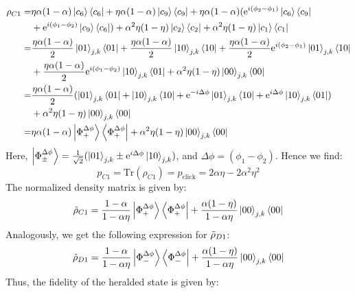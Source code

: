 \begin{subequations}
    \begin{align}
        \rho_{C1} =&  \eta\alpha(1-\alpha)\ket{c_6}\bra{c_6} + \eta\alpha(1-\alpha)\ket{c_9}\bra{c_9} + \eta\alpha(1-\alpha)(\text{e}^{i(\phi_{2}-\phi_{1})}\ket{c_6}\bra{c_9} \nonumber\\
        &+ \text{e}^{i(\phi_{1}-\phi_{2})}\ket{c_9}\bra{c_6}) + \alpha^2\eta(1-\eta)\ket{c_2}\bra{c_2} + \alpha^2\eta(1-\eta)\ket{c_1}\bra{c_1}\\
        =& \frac{\eta\alpha(1-\alpha)}{2}\ket{01}_{j,k}\bra{01} + \frac{\eta\alpha(1-\alpha)}{2}\ket{10}_{j,k}\bra{10} + \frac{\eta\alpha(1-\alpha)}{2}\text{e}^{i(\phi_{2}-\phi_{1})}\ket{01}_{j,k}\bra{10}\nonumber\\
        &+ \frac{\eta\alpha(1-\alpha)}{2}\text{e}^{i(\phi_{1}-\phi_{2})}\ket{10}_{j,k}\bra{01} + \alpha^2\eta(1-\eta)\ket{00}_{j,k}\bra{00}\\
        =& \frac{\eta\alpha(1-\alpha)}{2}(\ket{01}_{j,k}\bra{01} + \ket{10}_{j,k}\bra{10} + \text{e}^{-i\Delta\phi}\ket{01}_{j,k}\bra{10} + \text{e}^{i\Delta\phi}\ket{10}_{j,k}\bra{01})\nonumber\\
        &+ \alpha^2\eta(1-\eta)\ket{00}_{j,k}\bra{00}\\
        =& \eta\alpha(1-\alpha)\ket{\Phi^{\Delta\phi}_{+}}\bra{\Phi^{{\Delta\phi}}_{+}}+ \alpha^2\eta(1-\eta)\ket{00}_{j,k}\bra{00}
    \end{align}
\end{subequations}
Here, $\ket{\Phi^{\Delta\phi}_{\pm}} = \frac{1}{\sqrt{2}}(\ket{01}_{j,k} \pm \text{e}^{i\Delta\phi}\ket{10}_{j,k})$, and $\Delta\phi = (\phi_{1}-\phi_{2})$. Hence we find:
\begin{equation}
    p_{C1} = \text{Tr}(\rho_{C1}) = p_{\text{click}} = 2\alpha\eta - 2\alpha^2\eta^2
\end{equation}
The normalized density matrix is given by:
\begin{align}
    \Tilde{\rho}_{C1} = \frac{1-\alpha}{1-\alpha\eta}\ket{\Phi^{\Delta\phi}_{+}}\bra{\Phi^{\Delta\phi}_{+}} + \frac{\alpha(1-\eta)}{1-\alpha\eta}\ket{00}_{j,k}\bra{00}
\end{align}
Analogously, we get the following expression for $\Tilde{\rho}_{D1}$:
\begin{align}
    \Tilde{\rho}_{D1} = \frac{1-\alpha}{1-\alpha\eta}\ket{\Phi^{\Delta\phi}_{-}}\bra{\Phi^{\Delta\phi}_{-}} + \frac{\alpha(1-\eta)}{1-\alpha\eta}\ket{00}_{j,k}\bra{00}
\end{align}
Thus, the fidelity of the heralded state is given by:
